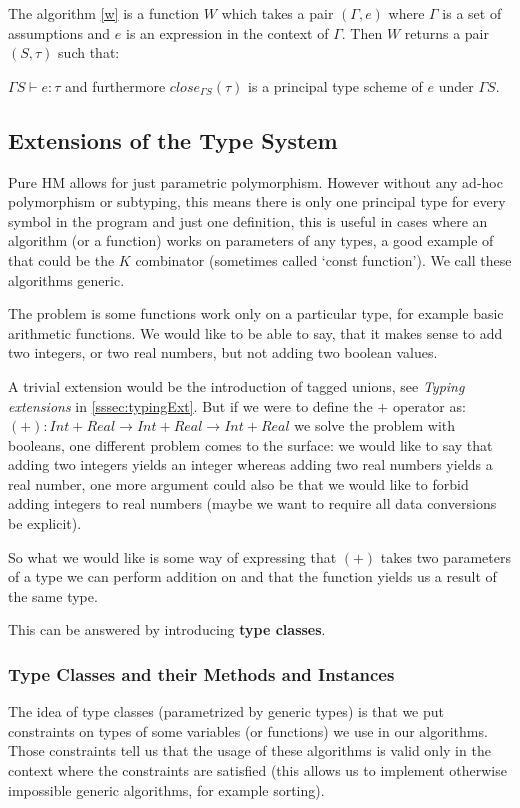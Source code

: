 The algorithm \ref{w} is a function $W$ which takes a pair $(\Gamma, e)$ where $\Gamma$ is a set of assumptions and $e$ is an expression in the context of $\Gamma$. Then $W$ returns a pair $(S, \tau)$ such that:

$\Gamma S \vdash e : \tau$ and furthermore $close_{\Gamma S}(\tau)$ is a principal type scheme of $e$ under $\Gamma S$.

\subsection{Extensions of the Type System}

Pure HM allows for just parametric polymorphism. However without any ad-hoc polymorphism or subtyping, this means there is only one principal type for every symbol in the program and just one definition, this is useful in cases where an algorithm (or a function) works on parameters of any types, a good example of that could be the $K$ combinator (sometimes called `const function'). We call these algorithms generic.

The problem is some functions work only on a particular type, for example basic arithmetic functions. We would like to be able to say, that it makes sense to add two integers, or two real numbers, but not adding two boolean values.

A trivial extension would be the introduction of tagged unions, see \emph{Typing extensions} in \ref{sssec:typingExt}. But if we were to define the $+$ operator as: $(+) : Int + Real \rightarrow Int + Real \rightarrow Int + Real$ we solve the problem with booleans, one different problem comes to the surface: we would like to say that adding two integers yields an integer whereas adding two real numbers yields a real number, one more argument could also be that we would like to forbid adding integers to real numbers (maybe we want to require all data conversions be explicit).

So what we would like is some way of expressing that $(+)$ takes two parameters of a type we can perform addition on and that the function yields us a result of the same type.

This can be answered by introducing \textbf{type classes}.

\subsubsection{Type Classes and their Methods and Instances}

The idea of type classes (parametrized by generic types) is that we put constraints on types of some variables (or functions) we use in our algorithms. Those constraints tell us that the usage of these algorithms is valid only in the context where the constraints are satisfied (this allows us to implement otherwise impossible generic algorithms, for example sorting).

